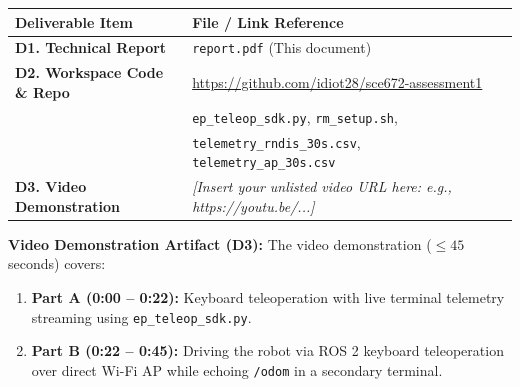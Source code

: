\documentclass[11pt,a4paper]{article}
\begin{document}
\begin{center}
\small
{}
\label{tab:deliverables}
\vspace{0.1cm}
\begin{tabular}{>{\raggedright\arraybackslash}p{5.0cm} >{\raggedright\arraybackslash}p{10.0cm}}
\toprule
\textbf{Deliverable Item} & \textbf{File / Link Reference} \\
\midrule
\textbf{D1. Technical Report} & \texttt{report.pdf} (This document) \\
\textbf{D2. Workspace Code \& Repo} & \url{https://github.com/idiot28/sce672-assessment1} \\
                                    & \texttt{ep\_teleop\_sdk.py}, \texttt{rm\_setup.sh}, \\
                                    & \texttt{telemetry\_rndis\_30s.csv}, \texttt{telemetry\_ap\_30s.csv} \\
\textbf{D3. Video Demonstration} & \textit{[Insert your unlisted video URL here: e.g., https://youtu.be/...]} \\
\bottomrule
\end{tabular}
\end{center}

\textbf{Video Demonstration Artifact (D3):}
The video demonstration ($\le 45$ seconds) covers:
\begin{enumerate}[noitemsep,topsep=1pt]
    \item \textbf{Part A (0:00 -- 0:22):} Keyboard teleoperation with live terminal telemetry streaming using \texttt{ep\_teleop\_sdk.py}.
    \item \textbf{Part B (0:22 -- 0:45):} Driving the robot via ROS 2 keyboard teleoperation over direct Wi-Fi AP while echoing \texttt{/odom} in a secondary terminal.
\end{enumerate}
\end{document}
